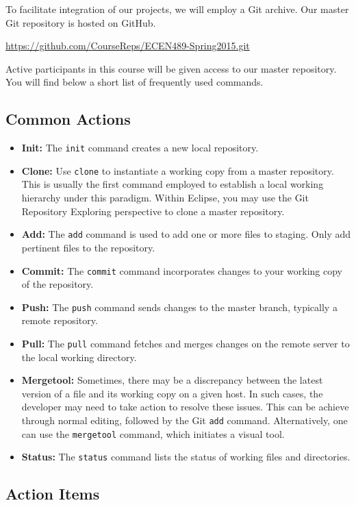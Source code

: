 \documentclass[11pt]{article}
\begin{document}
To facilitate integration of our projects, we will employ a Git archive.
Our master Git repository is hosted on GitHub.
\begin{center}
\url{https://github.com/CourseReps/ECEN489-Spring2015.git}
\end{center}
Active participants in this course will be given access to our master repository.
You will find below a short list of frequently used commands.


\subsection*{Common Actions}

\begin{itemize}
\item \textbf{Init:}
The \texttt{init} command creates a new local repository.
\item \textbf{Clone:}
Use \texttt{clone} to instantiate a working copy from a master repository.
This is usually the first command employed to establish a local working hierarchy under this paradigm.
Within Eclipse, you may use the Git Repository Exploring perspective to clone a master repository.
\item \textbf{Add:}
The \texttt{add} command is used to add one or more files to staging.
Only add pertinent files to the repository.
\item \textbf{Commit:}
The \texttt{commit} command incorporates changes to your working copy of the repository.
\item \textbf{Push:}
The \texttt{push} command sends changes to the master branch, typically a remote repository.
\item \textbf{Pull:}
The \texttt{pull} command fetches and merges changes on the remote server to the local working directory.
\item \textbf{Mergetool:}
Sometimes, there may be a discrepancy between the latest version of a file and its working copy on a given host.
In such cases, the developer may need to take action to resolve these issues.
This can be achieve through normal editing, followed by the Git \texttt{add} command.
Alternatively, one can use the  \texttt{mergetool} command, which initiates a visual tool.
\item \textbf{Status:}
The \texttt{status} command lists the status of working files and directories.
\end{itemize}


\subsection*{Action Items}
\end{document}
